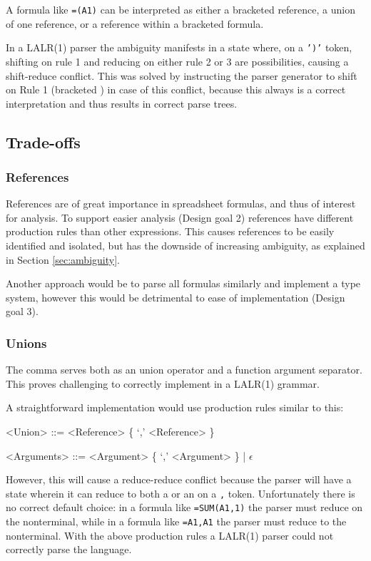 \documentclass[times]{smrauth}
\begin{document}
A formula like \texttt{=(A1)} can be interpreted as either a bracketed reference, a union of one reference, or a reference within a bracketed formula.

In a LALR(1) parser the ambiguity manifests in a state where, on a \texttt{')'} token, shifting on rule 1 and reducing on either rule 2 or 3 are possibilities, causing a shift-reduce conflict.
This was solved by instructing the parser generator to shift on Rule 1 (bracketed ) in case of this conflict, because this always is a correct interpretation and thus results in correct parse trees.

\subsection{Trade-offs}

\subsubsection{\textbf{References}}
\label{tradeoff:references}

References are of great importance in spreadsheet formulas, and thus of interest for analysis.
To support easier analysis (Design goal 2) references have different production rules than other expressions.
This causes references to be easily identified and isolated, but has the downside of increasing ambiguity, as explained in Section \ref{sec:ambiguity}. 

Another approach would be to parse all formulas similarly and implement a type system, however this would be detrimental to ease of implementation (Design goal 3).

\subsubsection{\textbf{Unions}}
\label{subsec:desing:unions}

The comma serves both as an union operator and a function argument separator.
This proves challenging to correctly implement in a LALR(1) grammar.

A straightforward implementation would use production rules similar to this:
\begin{grammar}
	<Union> ::= <Reference> \{ `,' <Reference> \}

	<Arguments> ::= <Argument> \{ `,' <Argument> \} | $\epsilon$
\end{grammar}

However, this will cause a reduce-reduce conflict because the parser will have a state wherein it can reduce to both a  or an  on a \texttt{,} token.
Unfortunately there is no correct default choice: in a formula like \texttt{=SUM(A1,1)} the parser must reduce on the  nonterminal, while in a formula like \texttt{=A1,A1} the parser must reduce to the  nonterminal.
With the above production rules a LALR(1) parser could not correctly parse the language.
\end{document}
